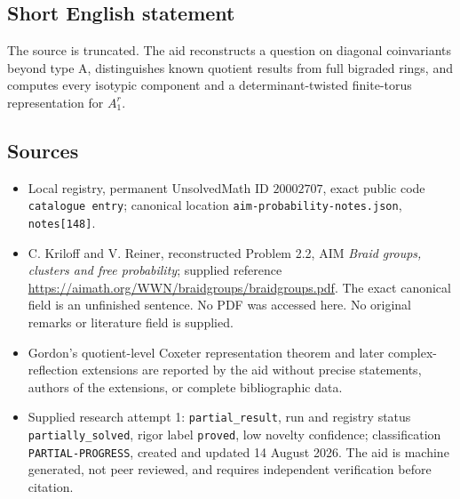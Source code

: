 \documentclass[11pt]{article}
\begin{document}
\subsection{Short English statement}
The source is truncated. The aid reconstructs a question on diagonal coinvariants beyond type A, distinguishes known quotient results from full bigraded rings, and computes every isotypic component and a determinant-twisted finite-torus representation for \(A_1^r\).
\subsection{Sources}
\begin{itemize}
\item Local registry, permanent UnsolvedMath ID \(20002707\), exact public code \texttt{catalogue entry}; canonical location \texttt{aim-probability-notes.json}, \texttt{notes[148]}.
\item C. Kriloff and V. Reiner, reconstructed Problem 2.2, AIM \emph{Braid groups, clusters and free probability}; supplied reference \url{https://aimath.org/WWN/braidgroups/braidgroups.pdf}. The exact canonical field is an unfinished sentence. No PDF was accessed here. No original remarks or literature field is supplied.
\item Gordon's quotient-level Coxeter representation theorem and later complex-reflection extensions are reported by the aid without precise statements, authors of the extensions, or complete bibliographic data.
\item Supplied research attempt 1: \texttt{partial\_result}, run and registry status \texttt{partially\_solved}, rigor label \texttt{proved}, low novelty confidence; classification \texttt{PARTIAL-PROGRESS}, created and updated 14 August 2026. The aid is machine generated, not peer reviewed, and requires independent verification before citation.
\end{itemize}
\end{document}
